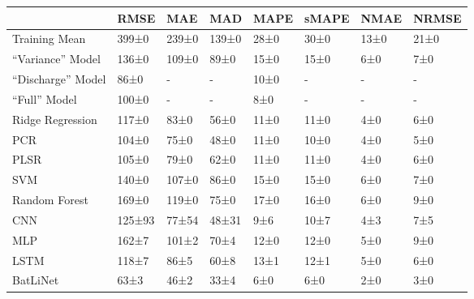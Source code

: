 \begin{tabular}{llllllll}
\toprule
 & RMSE & MAE & MAD & MAPE & sMAPE & NMAE & NRMSE \\
\midrule
Training Mean & 399±0 & 239±0 & 139±0 & 28±0 & 30±0 & 13±0 & 21±0 \\
``Variance'' Model & 136±0 & 109±0 & 89±0 & 15±0 & 15±0 & 6±0 & 7±0 \\
``Discharge'' Model & 86±0 & - & - & 10±0 & - & - & - \\
``Full'' Model & 100±0 & - & - & 8±0 & - & - & - \\
Ridge Regression & 117±0 & 83±0 & 56±0 & 11±0 & 11±0 & 4±0 & 6±0 \\
PCR & 104±0 & 75±0 & 48±0 & 11±0 & 10±0 & 4±0 & 5±0 \\
PLSR & 105±0 & 79±0 & 62±0 & 11±0 & 11±0 & 4±0 & 6±0 \\
SVM & 140±0 & 107±0 & 86±0 & 15±0 & 15±0 & 6±0 & 7±0 \\
Random Forest & 169±0 & 119±0 & 75±0 & 17±0 & 16±0 & 6±0 & 9±0 \\
CNN & 125±93 & 77±54 & 48±31 & 9±6 & 10±7 & 4±3 & 7±5 \\
MLP & 162±7 & 101±2 & 70±4 & 12±0 & 12±0 & 5±0 & 9±0 \\
LSTM & 118±7 & 86±5 & 60±8 & 13±1 & 12±1 & 5±0 & 6±0 \\
BatLiNet & 63±3 & 46±2 & 33±4 & 6±0 & 6±0 & 2±0 & 3±0 \\
\bottomrule
\end{tabular}
